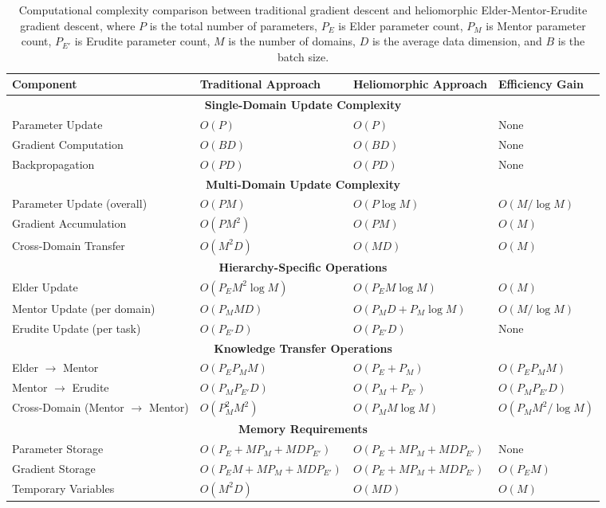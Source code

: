 \begin{table}[h]
\centering
\begin{tabular}{|p{3cm}|p{4.5cm}|p{4.5cm}|p{3cm}|}
\hline
\textbf{Component} & \textbf{Traditional Approach} & \textbf{Heliomorphic Approach} & \textbf{Efficiency Gain} \\
\hline
\multicolumn{4}{|c|}{\textbf{Single-Domain Update Complexity}} \\
\hline
Parameter Update & $O(P)$ & $O(P)$ & None \\
\hline
Gradient Computation & $O(BD)$ & $O(BD)$ & None \\
\hline
Backpropagation & $O(PD)$ & $O(PD)$ & None \\
\hline
\multicolumn{4}{|c|}{\textbf{Multi-Domain Update Complexity}} \\
\hline
Parameter Update (overall) & $O(PM)$ & $O(P \log M)$ & $O(M/\log M)$ \\
\hline
Gradient Accumulation & $O(PM^2)$ & $O(PM)$ & $O(M)$ \\
\hline
Cross-Domain Transfer & $O(M^2D)$ & $O(MD)$ & $O(M)$ \\
\hline
\multicolumn{4}{|c|}{\textbf{Hierarchy-Specific Operations}} \\
\hline
Elder Update & $O(P_E M^2 \log M)$ & $O(P_E M \log M)$ & $O(M)$ \\
\hline
Mentor Update (per domain) & $O(P_M M D)$ & $O(P_M D + P_M \log M)$ & $O(M/\log M)$ \\
\hline
Erudite Update (per task) & $O(P_{E'} D)$ & $O(P_{E'} D)$ & None \\
\hline
\multicolumn{4}{|c|}{\textbf{Knowledge Transfer Operations}} \\
\hline
Elder $\to$ Mentor & $O(P_E P_M M)$ & $O(P_E + P_M)$ & $O(P_E P_M M)$ \\
\hline
Mentor $\to$ Erudite & $O(P_M P_{E'} D)$ & $O(P_M + P_{E'})$ & $O(P_M P_{E'} D)$ \\
\hline
Cross-Domain (Mentor $\to$ Mentor) & $O(P_M^2 M^2)$ & $O(P_M M \log M)$ & $O(P_M M^2/\log M)$ \\
\hline
\multicolumn{4}{|c|}{\textbf{Memory Requirements}} \\
\hline
Parameter Storage & $O(P_E + MP_M + MD P_{E'})$ & $O(P_E + MP_M + MD P_{E'})$ & None \\
\hline
Gradient Storage & $O(P_E M + MP_M + MD P_{E'})$ & $O(P_E + MP_M + MD P_{E'})$ & $O(P_E M)$ \\
\hline
Temporary Variables & $O(M^2D)$ & $O(MD)$ & $O(M)$ \\
\hline
\end{tabular}
\caption{Computational complexity comparison between traditional gradient descent and heliomorphic Elder-Mentor-Erudite gradient descent, where $P$ is the total number of parameters, $P_E$ is Elder parameter count, $P_M$ is Mentor parameter count, $P_{E'}$ is Erudite parameter count, $M$ is the number of domains, $D$ is the average data dimension, and $B$ is the batch size.}
\label{tab:complexity_comparison}
\end{table}

